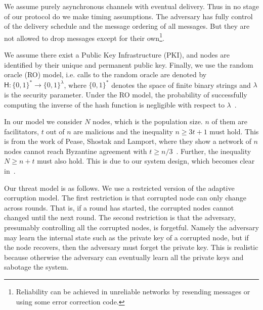 We assume purely asynchronous channels with eventual delivery.
Thus in no stage of our protocol do we make timing assumptions.
The adversary has fully control of the delivery schedule and the message ordering of all messages.
But they are not allowed to drop messages except for their own\footnote{
    Reliability can be achieved in unreliable networks by resending messages or using some error correction code.
}.

We assume there exist a Public Key Infrastructure (PKI), and nodes are identified by their unique and permanent public key.
Finally, we use the random oracle (RO) model, i.e. calls to the random oracle are denoted by $\textsf{H}: \{0, 1\}^* \rightarrow \{0, 1\}^\lambda$,
where $\{0, 1\}^*$ denotes the space of finite binary strings and $\lambda$ is the security parameter.
Under the RO model, the probability of successfully computing the inverse of the hash function is negligible with respect to $\lambda$~\cite{bellare1993random}.

In our model we consider $N$ nodes, which is the population size.
$n$ of them are facilitators, $t$ out of $n$ are malicious and the inequality
$n \ge 3t + 1$ must hold.
This is from the work of Pease, Shostak and Lamport, where they show a network of $n$ nodes cannot reach Byzantine agreement with $t \ge n/3$~\cite{pease1980reaching}.
Further, the inequality $N \ge n + t$ must also hold.
This is due to our system design, which becomes clear in~.

Our threat model is as follows. 
We use a restricted version of the adaptive corruption model.
The first restriction is that corrupted node can only change across rounds.
That is, if a round has started, the corrupted nodes cannot changed until the next round.
The second restriction is that the adversary, presumably controlling all the corrupted nodes, is forgetful.
Namely the adversary may learn the internal state such as the private key of a corrupted node,
but if the node recovers, then the adversary must forget the private key.
This is realistic because otherwise the adversary can eventually learn all the private keys and sabotage the system.

